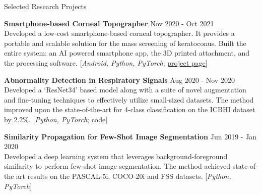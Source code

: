 \documentclass{resume} %
\begin{document}
\begin{rSection}{Selected Research Projects} %



\vspace{-8pt}

\item \textbf{Smartphone-based Corneal Topographer} \hfill Nov 2020 - Oct 2021 \\ 
Developed a low-cost smartphone-based corneal topographer. It provides a portable and scalable solution for the mass screening of keratoconus. Built the entire system: an AI powered smartphone app, the 3D printed attachment, and the processing software. [\textit{Android, Python, PyTorch}; \href{https://www.microsoft.com/en-us/research/project/smartkc-a-smartphone-based-corneal-topographer/}{project page}]


\item \textbf{Abnormality Detection in Respiratory Signals} \hfill Aug 2020 - Nov 2020\\ Developed a `ResNet34' based model along with a suite of novel augmentation and fine-tuning techniques to effectively utilize small-sized datasets. The method improved upon the state-of-the-art for 4-class classification on the ICBHI dataset by 2.2\%. [\textit{Python, PyTorch}; \href{https://github.com/microsoft/RespireNet}{code}] %

\item \textbf{Similarity Propagation for Few-Shot Image Segmentation} \hfill Jun 2019 - Jan 2020\\
Developed a deep learning system that leverages background-foreground similarity to perform few-shot image segmentation. The method achieved state-of-the art results on the PASCAL-5i, COCO-20i and FSS datasets. [\textit{Python, PyTorch}] %


\end{rSection}
\end{document}
